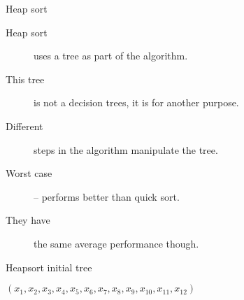 \begin{frame}{Heap sort}
  \begin{description}
    \item[Heap sort] uses a tree as part of the algorithm.
    \vspace{4mm}
    \item[This tree] is not a decision trees, it is for another purpose.
    \vspace{4mm}
    \item[Different] steps in the algorithm manipulate the tree.
    \vspace{4mm}
    \item[Worst case] -- performs better than quick sort.
    \vspace{4mm}
    \item[They have] the same average performance though.
  \end{description}
\end{frame}

\begin{frame}[fragile]{Heapsort initial tree}
  \begin{center}
    $(x_1,x_2,x_3,x_4,x_5,x_6,x_7,x_8,x_9,x_{10},x_{11},x_{12})$ \\[1cm]
  \end{center}
\end{frame}


